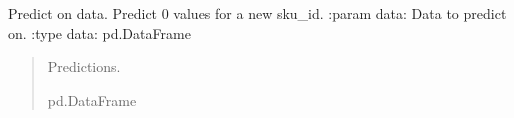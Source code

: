 \documentclass[letterpaper,10pt,english]{sphinxmanual}
\begin{document}
\begin{fulllineitems}
\begin{fulllineitems}
\begin{quote}
\begin{description}
\begin{itemize}
\end{itemize}

\end{description}\end{quote}

\end{fulllineitems}


\begin{fulllineitems}
\label{\detokenize{src_demand_forecast.models:src_demand_forecast.models.train_model.MultiTargetModel.predict}}
\pysigstartsignatures
{}
\pysigstopsignatures
\sphinxAtStartPar
Predict on data.
Predict 0 values for a new sku\_id.
:param data: Data to predict on.
:type data: pd.DataFrame
\begin{quote}\begin{description}
\sphinxAtStartPar
Predictions.

\sphinxAtStartPar
pd.DataFrame

\end{description}\end{quote}

\end{fulllineitems}


\end{fulllineitems}

\end{document}
